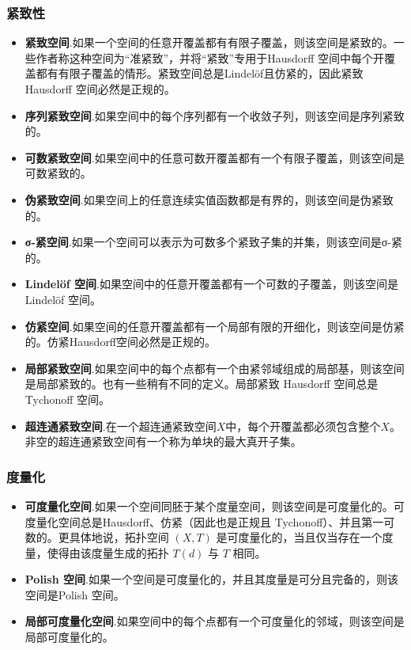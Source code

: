 \subsubsection{紧致性}
\begin{itemize}
\item \textbf{紧致空间}.如果一个空间的任意开覆盖都有有限子覆盖，则该空间是紧致的。一些作者称这种空间为“准紧致”，并将“紧致”专用于Hausdorff 空间中每个开覆盖都有有限子覆盖的情形。紧致空间总是Lindelöf且仿紧的，因此紧致 Hausdorff 空间必然是正规的。
\item \textbf{序列紧致空间}.如果空间中的每个序列都有一个收敛子列，则该空间是序列紧致的。
\item \textbf{可数紧致空间}.如果空间中的任意可数开覆盖都有一个有限子覆盖，则该空间是可数紧致的。
\item \textbf{伪紧致空间}.如果空间上的任意连续实值函数都是有界的，则该空间是伪紧致的。
\item \textbf{σ-紧空间}.如果一个空间可以表示为可数多个紧致子集的并集，则该空间是σ-紧的。
\item \textbf{Lindelöf 空间}.如果空间中的任意开覆盖都有一个可数的子覆盖，则该空间是Lindelöf 空间。
\item \textbf{仿紧空间}.如果空间的任意开覆盖都有一个局部有限的开细化，则该空间是仿紧的。仿紧Hausdorff空间必然是正规的。
\item \textbf{局部紧致空间}.如果空间中的每个点都有一个由紧邻域组成的局部基，则该空间是局部紧致的。也有一些稍有不同的定义。局部紧致 Hausdorff 空间总是 Tychonoff 空间。
\item \textbf{超连通紧致空间}.在一个超连通紧致空间$X$中，每个开覆盖都必须包含整个$X$。非空的超连通紧致空间有一个称为单块的最大真开子集。
\end{itemize}
\subsubsection{度量化}
\begin{itemize}
\item \textbf{可度量化空间}.如果一个空间同胚于某个度量空间，则该空间是可度量化的。可度量化空间总是Hausdorff、仿紧（因此也是正规且 Tychonoff）、并且第一可数的。更具体地说，拓扑空间 $(X, T)$ 是可度量化的，当且仅当存在一个度量，使得由该度量生成的拓扑 $T(d)$ 与 $T$ 相同。
\item \textbf{Polish 空间}.如果一个空间是可度量化的，并且其度量是可分且完备的，则该空间是Polish 空间。
\item \textbf{局部可度量化空间}.如果空间中的每个点都有一个可度量化的邻域，则该空间是局部可度量化的。
\end{itemize}